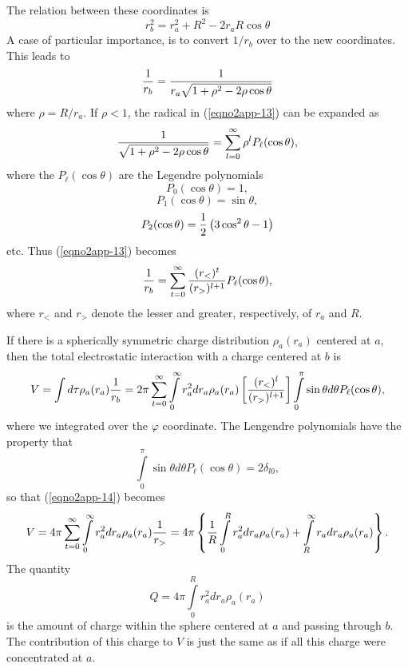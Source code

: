 \noindent
The relation between these coordinates is
\begin{equation}
r^2_b = r^2_a + R^2 - 2 r_a R \cos \theta
\end{equation}
A case of particular importance, is to convert $1/r_b$ over to the new 
coordinates. This leads to
\begin{equation}
{1 \over r_b} = {1 \over r_a {\sqrt{1+ \rho^2 - 2 \rho \cos 
\theta}}}
\label{eqno2app-13}
\end{equation}
where $\rho = R / r_a$.  If $\rho < 1$, the radical in
(\ref{eqno2app-13}) can be expanded as
\begin{equation}
{1 \over {\sqrt{1 + \rho^2 - 2 \rho \cos \theta}}} = 
\sum^{\infty}_{l=0} \rho^l P_\ell ( \cos \theta ) ,
\end{equation}
where the $P_\ell ( \cos \theta )$ are the Legendre polynomials
\begin{equation}
P_0 \left( \cos \theta \right) = 1,
\end{equation}
\begin{equation}
P_1 ( \cos \theta ) = \sin \theta ,
\end{equation}
\begin{equation}
P_2 ( \cos \theta ) = {1 \over 2} \left( 3 \cos^2 \theta - 1 \right)
\end{equation}
etc. Thus (\ref{eqno2app-13}) becomes
\begin{equation}
{1 \over r_b} = \sum^{\infty}_{t=0} {(r_<)^t \over (r_>)^{l+1}} 
P_\ell ( \cos \theta ) ,
\end{equation}
where $r_<$ and $r_>$ denote the lesser and greater, respectively, 
of $r_a$ and $R$.
    
If there is a spherically symmetric charge distribution $\rho_a(r_a)$ 
centered at $a$, then the total electrostatic interaction with a 
charge centered at $b$ is
\begin{equation}
V = \int d \tau \rho_a (r_a) {1 \over r_b} = 2 \pi 
\sum^{\infty}_{t=0} \int\limits^{\infty}_{0} r^2_a d r_a \rho_a ( 
r_a ) \left[ {(r_<)^l \over (r_>)^{l+1}} \right] 
\int\limits^{\pi}_{0} \sin \theta d \theta P_\ell ( \cos \theta ),
\label{eqno2app-14}
\end{equation}
where we integrated over the $\varphi$ coordinate. The Lengendre 
polynomials have the property that
\begin{equation}
\int\limits^{\pi}_{0} \sin \theta d \theta P_\ell ( \cos \theta ) = 2 
\delta_{l0} ,
\end{equation}
so that (\ref{eqno2app-14}) becomes
\begin{equation}
V = 4 \pi \sum^{\infty}_{t=0} \int\limits^{\infty}_{0} r^2_a d r_a 
\rho_a ( r_a ) {1 \over r_>} = 4 \pi \left\{ {1 \over R} 
\int\limits^{R}_{0} r^2_a dr_a \rho_a ( r_a ) + 
\int\limits^{\infty}_{R} r_a dr_a \rho_a ( r_a ) \right\}.
\label{eqno2app-15}
\end{equation}
The quantity
\begin{equation}
Q = 4 \pi \int\limits^{R}_{0} r^2_a dr_a \rho_a ( r_a )
\end{equation}
is the amount of charge within the sphere centered at $a$ and passing 
through $b$. The contribution of this charge to $V$ is just the same as 
if all this charge were concentrated at $a$.

